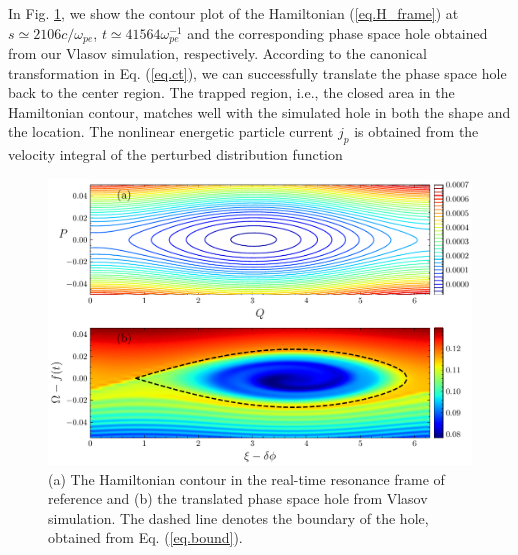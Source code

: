 
In Fig. \ref{fig.hole}, we show the contour plot of the Hamiltonian (\ref{eq.H_frame}) at $s\simeq2106c/\omega_{pe}$, $t\simeq41564\omega_{pe}^{-1}$ and the corresponding phase space hole obtained from our Vlasov simulation, respectively.
According to the canonical transformation in Eq. (\ref{eq.ct}), we can successfully translate the phase space hole back to the center region. 
The trapped region, i.e., the closed area in the Hamiltonian contour, matches well with the simulated hole in both the shape and the location.
The nonlinear energetic particle current $j_p$ is obtained from the velocity integral of the perturbed distribution function 
 \begin{figure}
     \centering
     \includegraphics[scale=0.5]{img/Ham_and_f.pdf}
     \caption{(a) The Hamiltonian contour in the real-time resonance frame of reference and (b) the translated phase space hole from Vlasov simulation. The dashed line denotes the boundary of the hole, obtained from Eq. (\ref{eq.bound}).
     \label{fig.hole}
     }
 \end{figure}
